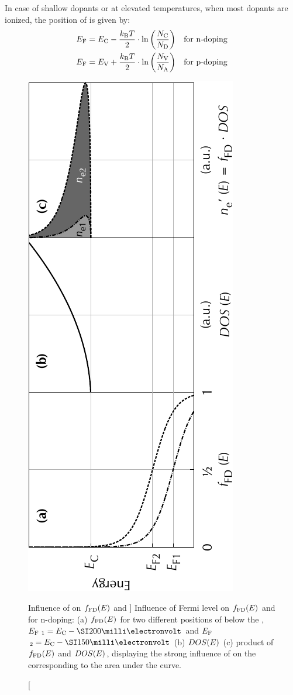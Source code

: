 In case of shallow dopants or at elevated temperatures, when most dopants are ionized, the position of \Ef is given by:
\begin{align}
 E_\text{F} &= E_\text{C} - \frac{k_\text{B}T}{2}\cdot \ln \left(\frac{N_\text{C}}{N_\text{D}}\right) & \text{for n-doping} \\
 E_\text{F} &= E_\text{V} + \frac{k_\text{B}T}{2}\cdot \ln \left(\frac{N_\text{V}}{N_\text{A}}\right) & \text{for p-doping}
\end{align}

\begin{figure}[b]
\centering%
\includegraphics[angle=-90]{plot/sim_Fermi-DOS-n-inorg}%
\setcapwidth[c]{\tmCapWidth}%
\caption
[Influence of \Ef on $f_\text{FD}(E)$ and \ne]
{Influence of Fermi level \Ef on \fFDLong $f_\text{FD}(E)$ and \neLong \ne for n-doping: (a) $f_\text{FD}(E)$ for two different positions of \Ef below the \EcLong \Ec, $E_\text{F}${}$_1=\Ec-\meV{200}$ and $E_\text{F}${}$_2=\Ec-\meV{150}$ (b) \dosLong $DOS(E)$ (c) product of $f_\text{FD}(E)$ and $DOS(E)$, displaying the strong influence of \Ef on the \neLong \ne corresponding to the area under the curve.}
\label{fig:sim_Fermi-DOS-n-inorg}
\end{figure}
